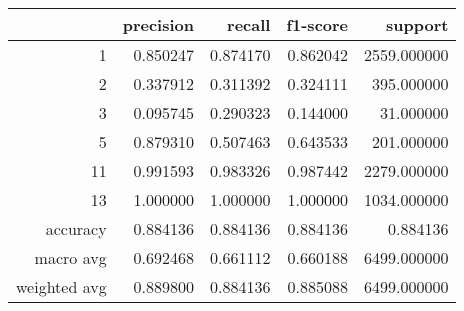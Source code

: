 \begin{tabular}{rrrrr}
\toprule
 & precision & recall & f1-score & support \\
\midrule
1 & 0.850247 & 0.874170 & 0.862042 & 2559.000000 \\
2 & 0.337912 & 0.311392 & 0.324111 & 395.000000 \\
3 & 0.095745 & 0.290323 & 0.144000 & 31.000000 \\
5 & 0.879310 & 0.507463 & 0.643533 & 201.000000 \\
11 & 0.991593 & 0.983326 & 0.987442 & 2279.000000 \\
13 & 1.000000 & 1.000000 & 1.000000 & 1034.000000 \\
accuracy & 0.884136 & 0.884136 & 0.884136 & 0.884136 \\
macro avg & 0.692468 & 0.661112 & 0.660188 & 6499.000000 \\
weighted avg & 0.889800 & 0.884136 & 0.885088 & 6499.000000 \\
\bottomrule
\end{tabular}

